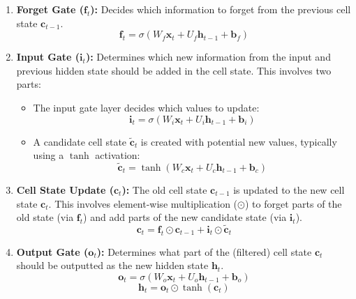 \begin{enumerate}
    \item \textbf{Forget Gate (\( \bm{f}_t \)):} Decides which information to forget from the previous cell state \( \bm{c}_{t-1} \).
          \begin{equation}
              \bm{f}_t = \sigma(W_f \bm{x}_t + U_f \bm{h}_{t-1} + \bm{b}_f)
              \label{eq:lstm-forget-gate}
          \end{equation}

    \item \textbf{Input Gate (\( \bm{i}_t \)):} Determines which new information from the input and previous hidden state should be added in the cell state. This involves two parts:
          \begin{itemize}
              \item The input gate layer decides which values to update:
                    \begin{equation}
                        \bm{i}_t = \sigma(W_i \bm{x}_t + U_i \bm{h}_{t-1} + \bm{b}_i)
                        \label{eq:lstm-input-gate}
                    \end{equation}
              \item A candidate cell state \( \bm{\tilde{c}}_t \) is created with potential new values, typically using a \( \tanh \) activation:
                    \begin{equation}
                        \bm{\tilde{c}}_t = \tanh(W_c \bm{x}_t + U_c \bm{h}_{t-1} + \bm{b}_c)
                        \label{eq:lstm-candidate-cell}
                    \end{equation}
          \end{itemize}

    \item \textbf{Cell State Update (\( \bm{c}_t \)):} The old cell state \( \bm{c}_{t-1} \) is updated to the new cell state \( \bm{c}_t \). This involves element-wise multiplication (\(\odot\)) to forget parts of the old state (via \( \bm{f}_t \)) and add parts of the new candidate state (via \( \bm{i}_t \)).
          \begin{equation}
              \bm{c}_t = \bm{f}_t \odot \bm{c}_{t-1} + \bm{i}_t \odot \bm{\tilde{c}}_t
              \label{eq:lstm-cell-update}
          \end{equation}

    \item \textbf{Output Gate (\( \bm{o}_t \)):} Determines what part of the (filtered) cell state \( \bm{c}_t \) should be outputted as the new hidden state \( \bm{h}_t \).
          \begin{equation}
              \bm{o}_t = \sigma(W_o \bm{x}_t + U_o \bm{h}_{t-1} + \bm{b}_o)
              \label{eq:lstm-output-gate}
          \end{equation}
          \begin{equation}
              \bm{h}_t = \bm{o}_t \odot \tanh(\bm{c}_t)
              \label{eq:lstm-hidden-state}
          \end{equation}
\end{enumerate}

